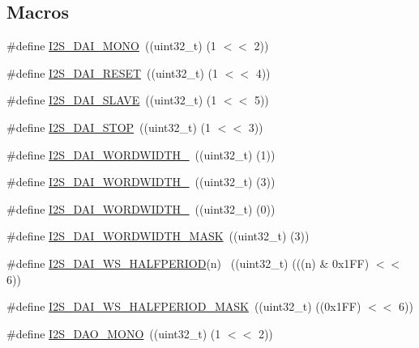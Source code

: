 \subsection*{Macros}
\begin{DoxyCompactItemize}
\item 
\#define \hyperlink{group__I2S__17XX__40XX_ga352feb095d028efc44d17f72beacfae5}{I2\+S\+\_\+\+D\+A\+I\+\_\+\+M\+O\+NO}~((uint32\+\_\+t) (1 $<$$<$ 2))
\item 
\#define \hyperlink{group__I2S__17XX__40XX_gae57a0b564a399a726a9a6737f5733beb}{I2\+S\+\_\+\+D\+A\+I\+\_\+\+R\+E\+S\+ET}~((uint32\+\_\+t) (1 $<$$<$ 4))
\item 
\#define \hyperlink{group__I2S__17XX__40XX_ga664f6b8ac38d7b3a23aae4e7a2fa1c6f}{I2\+S\+\_\+\+D\+A\+I\+\_\+\+S\+L\+A\+VE}~((uint32\+\_\+t) (1 $<$$<$ 5))
\item 
\#define \hyperlink{group__I2S__17XX__40XX_ga2ed2d2a9f59339ad3cf1f28a78bfcad6}{I2\+S\+\_\+\+D\+A\+I\+\_\+\+S\+T\+OP}~((uint32\+\_\+t) (1 $<$$<$ 3))
\item 
\#define \hyperlink{group__I2S__17XX__40XX_ga26e60492415a246afde8d4ede5aa292e}{I2\+S\+\_\+\+D\+A\+I\+\_\+\+W\+O\+R\+D\+W\+I\+D\+T\+H\+\_}~((uint32\+\_\+t) (1))
\item 
\#define \hyperlink{group__I2S__17XX__40XX_ga576561248aa7e6f27c5ef6c51def80ed}{I2\+S\+\_\+\+D\+A\+I\+\_\+\+W\+O\+R\+D\+W\+I\+D\+T\+H\+\_}~((uint32\+\_\+t) (3))
\item 
\#define \hyperlink{group__I2S__17XX__40XX_ga8bd50ada05c4cd981f07be7a3b1002dc}{I2\+S\+\_\+\+D\+A\+I\+\_\+\+W\+O\+R\+D\+W\+I\+D\+T\+H\+\_}~((uint32\+\_\+t) (0))
\item 
\#define \hyperlink{group__I2S__17XX__40XX_ga1177f9594c24141162839aafe829fcb9}{I2\+S\+\_\+\+D\+A\+I\+\_\+\+W\+O\+R\+D\+W\+I\+D\+T\+H\+\_\+\+M\+A\+SK}~((uint32\+\_\+t) (3))
\item 
\#define \hyperlink{group__I2S__17XX__40XX_ga450d3ddbf42df650d0771ce9ed388bbd}{I2\+S\+\_\+\+D\+A\+I\+\_\+\+W\+S\+\_\+\+H\+A\+L\+F\+P\+E\+R\+I\+OD}(n)    ~((uint32\+\_\+t) (((n) \& 0x1\+F\+F) $<$$<$ 6))
\item 
\#define \hyperlink{group__I2S__17XX__40XX_gaa960b95856c5f78a0eaed42d383dd124}{I2\+S\+\_\+\+D\+A\+I\+\_\+\+W\+S\+\_\+\+H\+A\+L\+F\+P\+E\+R\+I\+O\+D\+\_\+\+M\+A\+SK}~((uint32\+\_\+t) ((0x1\+F\+F) $<$$<$ 6))
\item 
\#define \hyperlink{group__I2S__17XX__40XX_gab32b25d6de6c9c964421ff08c1402e03}{I2\+S\+\_\+\+D\+A\+O\+\_\+\+M\+O\+NO}~((uint32\+\_\+t) (1 $<$$<$ 2))
\item 
$$
\end{DoxyCompactItemize}
